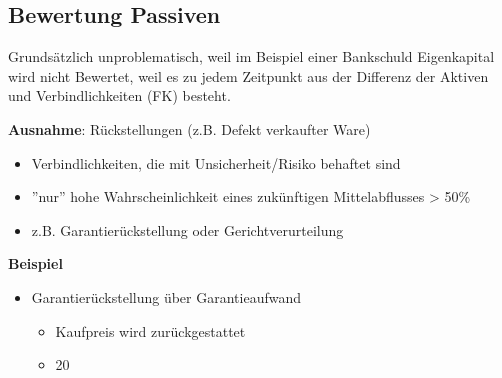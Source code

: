 \subsection{Bewertung Passiven}
Grundsätzlich unproblematisch, weil im Beispiel einer Bankschuld 
Eigenkapital wird nicht Bewertet, weil es zu jedem Zeitpunkt aus der Differenz  der Aktiven und Verbindlichkeiten (FK) besteht.

\textbf{Ausnahme}: Rückstellungen  (z.B. Defekt verkaufter Ware)
\begin{itemize}
    \item Verbindlichkeiten, die mit Unsicherheit/Risiko behaftet sind
    \item ''nur'' hohe Wahrscheinlichkeit eines zukünftigen Mittelabflusses > 50\%
    \item z.B. Garantierückstellung oder Gerichtverurteilung
\end{itemize}

\textbf{Beispiel}
\begin{itemize}
    \item Garantierückstellung über Garantieaufwand
    \begin{itemize}
        \item Kaufpreis wird zurückgestattet
        \item 20
    \end{itemize}
\end{itemize}
